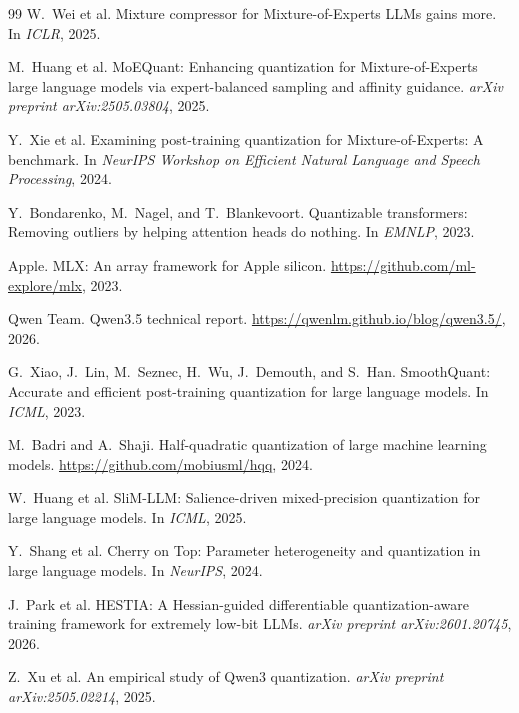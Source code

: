 \documentclass{article}
\begin{document}
\begin{thebibliography}{99}
W.~Wei et al.
\newblock Mixture compressor for Mixture-of-Experts LLMs gains more.
\newblock In \emph{ICLR}, 2025.

M.~Huang et al.
\newblock MoEQuant: Enhancing quantization for Mixture-of-Experts large language models via expert-balanced sampling and affinity guidance.
\newblock \emph{arXiv preprint arXiv:2505.03804}, 2025.

Y.~Xie et al.
\newblock Examining post-training quantization for Mixture-of-Experts: A benchmark.
\newblock In \emph{NeurIPS Workshop on Efficient Natural Language and Speech Processing}, 2024.

Y.~Bondarenko, M.~Nagel, and T.~Blankevoort.
\newblock Quantizable transformers: Removing outliers by helping attention heads do nothing.
\newblock In \emph{EMNLP}, 2023.

Apple.
\newblock MLX: An array framework for Apple silicon.
\newblock \url{https://github.com/ml-explore/mlx}, 2023.

Qwen Team.
\newblock Qwen3.5 technical report.
\newblock \url{https://qwenlm.github.io/blog/qwen3.5/}, 2026.

G.~Xiao, J.~Lin, M.~Seznec, H.~Wu, J.~Demouth, and S.~Han.
\newblock SmoothQuant: Accurate and efficient post-training quantization for large language models.
\newblock In \emph{ICML}, 2023.

M.~Badri and A.~Shaji.
\newblock Half-quadratic quantization of large machine learning models.
\newblock \url{https://github.com/mobiusml/hqq}, 2024.

W.~Huang et al.
\newblock SliM-LLM: Salience-driven mixed-precision quantization for large language models.
\newblock In \emph{ICML}, 2025.

Y.~Shang et al.
\newblock Cherry on Top: Parameter heterogeneity and quantization in large language models.
\newblock In \emph{NeurIPS}, 2024.

J.~Park et al.
\newblock HESTIA: A Hessian-guided differentiable quantization-aware training framework for extremely low-bit LLMs.
\newblock \emph{arXiv preprint arXiv:2601.20745}, 2026.

Z.~Xu et al.
\newblock An empirical study of Qwen3 quantization.
\newblock \emph{arXiv preprint arXiv:2505.02214}, 2025.


\end{thebibliography}
\end{document}

